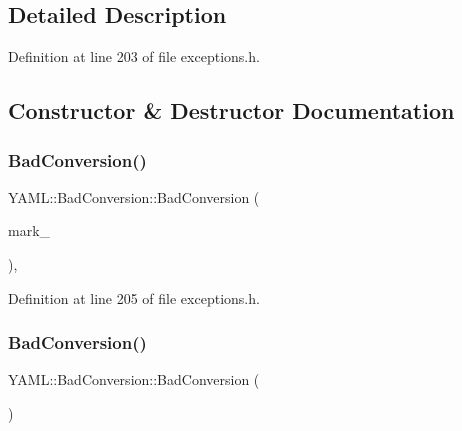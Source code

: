 \subsection{Detailed Description}


Definition at line 203 of file exceptions.\+h.



\subsection{Constructor \& Destructor Documentation}
\mbox{\label{class_y_a_m_l_1_1_bad_conversion_a3b9363f4a2a558fde5c612d1b404fce4}} 
\subsubsection{\texorpdfstring{BadConversion()}{BadConversion()}\hspace{0.1cm}{\footnotesize\ttfamily [1/2]}}
{\footnotesize\ttfamily Y\+A\+M\+L\+::\+Bad\+Conversion\+::\+Bad\+Conversion (\begin{DoxyParamCaption}\item[{const \mbox{\hyperlink{struct_y_a_m_l_1_1_mark}{Mark}} \&}]{mark\+\_\+ }\end{DoxyParamCaption})\hspace{0.3cm}{\ttfamily [inline]}, {\ttfamily [explicit]}}



Definition at line 205 of file exceptions.\+h.

\mbox{\label{class_y_a_m_l_1_1_bad_conversion_a7193fd2c22a3724030e150a32f2d9d23}} 
\subsubsection{\texorpdfstring{BadConversion()}{BadConversion()}\hspace{0.1cm}{\footnotesize\ttfamily [2/2]}}
{\footnotesize\ttfamily Y\+A\+M\+L\+::\+Bad\+Conversion\+::\+Bad\+Conversion (\begin{DoxyParamCaption}\item[{const \mbox{\hyperlink{class_y_a_m_l_1_1_bad_conversion}{Bad\+Conversion}} \&}]{ }\end{DoxyParamCaption})\hspace{0.3cm}{\ttfamily [default]}}

